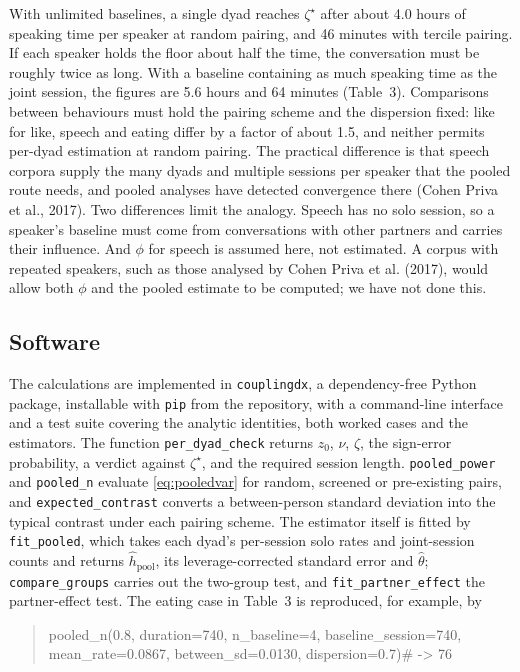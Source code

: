 \documentclass[12pt]{article}
\begin{document}
With unlimited baselines, a single dyad reaches $\zeta^\star$ after about 4.0
hours of speaking time per speaker at random pairing, and 46 minutes with tercile
pairing. If each speaker holds the floor about half the time, the conversation
must be roughly twice as long. With a baseline containing as much speaking time
as the joint session, the figures are 5.6 hours and 64 minutes (Table~3).
Comparisons between behaviours must hold the pairing scheme and the dispersion
fixed: like for like, speech and eating differ by a factor of about 1.5, and
neither permits per-dyad estimation at random pairing. The practical difference
is that speech corpora supply the many dyads and multiple sessions per speaker
that the pooled route needs, and pooled analyses have detected convergence there
(Cohen Priva et al., 2017). Two differences limit the analogy. Speech has no solo
session, so a speaker's baseline must come from conversations with other partners
and carries their influence. And $\phi$ for speech is assumed here, not estimated.
A corpus with repeated speakers, such as those analysed by Cohen Priva et al.
(2017), would allow both $\phi$ and the pooled estimate to be computed; we have
not done this.

\subsection*{Software}

The calculations are implemented in \texttt{couplingdx}, a dependency-free
Python package, installable with \texttt{pip} from the repository, with a
command-line interface and a test suite covering the analytic identities, both
worked cases and the estimators. The function
\texttt{per\_dyad\_check} returns $z_0$, $\nu$, $\zeta$, the sign-error
probability, a verdict against $\zeta^\star$, and the required session length.
\texttt{pooled\_power} and \texttt{pooled\_n} evaluate \eqref{eq:pooledvar} for
random, screened or pre-existing pairs, and \texttt{expected\_contrast} converts a
between-person standard deviation into the typical contrast under each pairing
scheme. The estimator itself is fitted by \texttt{fit\_pooled}, which takes each
dyad's per-session solo rates and joint-session counts and returns
$\hat h_{\mathrm{pool}}$, its leverage-corrected standard error and $\hat\theta$;
\texttt{compare\_groups} carries out the two-group test, and
\texttt{fit\_partner\_effect} the partner-effect test. The eating case in Table~3 is reproduced, for example, by

\begin{quote}\singlespacing\ttfamily\small
pooled\_n(0.8, duration=740, n\_baseline=4, baseline\_session=740,\\
\hspace*{2em}mean\_rate=0.0867, between\_sd=0.0130, dispersion=0.7)\hspace{1em}\# -> 76
\end{quote}
\end{document}
